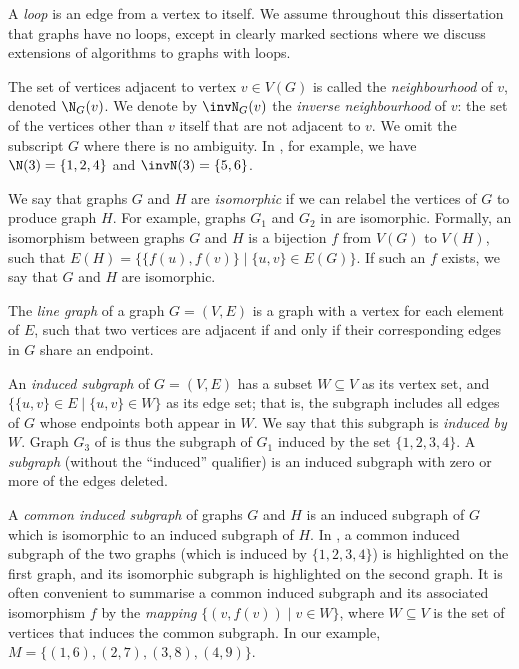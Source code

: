 A \emph{loop} is an edge from a vertex to itself. We assume throughout this
dissertation that graphs have no loops, except in clearly marked sections where
we discuss extensions of algorithms to graphs with loops.

The set of vertices adjacent to vertex $v \in V(G)$
is called the \emph{neighbourhood} of $v$, denoted $\N_G(v)$. We denote
by $\invN_G(v)$ the \emph{inverse neighbourhood} of $v$: the set
of the vertices other than $v$ itself that are not adjacent to $v$.
We omit the subscript $G$ where there is no ambiguity.
In , for example, we have $\N(3) = \{1,2,4\}$ and
$\invN(3) = \{5,6\}$.

We say that graphs $G$ and $H$ are \emph{isomorphic} if we can relabel
the vertices of $G$ to produce graph $H$. For example, graphs $G_1$
and $G_2$ in  are isomorphic.
Formally, an isomorphism between graphs $G$ and $H$ is a bijection $f$
from $V(G)$ to $V(H)$, such that $E(H) = \{\{f(u), f(v)\} \mid \{u, v\} \in E(G)\}$.
If such an $f$ exists, we say that $G$ and $H$ are isomorphic.

The \emph{line graph} of a graph $G=(V,E)$ is a graph with a vertex for each element
of $E$, such that two vertices are adjacent if and only if their corresponding edges
in $G$ share an endpoint.

An \emph{induced subgraph} of $G = (V, E)$ has a subset $W \subseteq V$ as its
vertex set, and $\{\{u, v\} \in E \mid \{u, v\} \in W\}$ as its edge set; that
is, the subgraph includes all edges of $G$ whose endpoints both appear in
$W$.  We say that this subgraph is \emph{induced by} $W$.
Graph $G_3$ of  is thus the subgraph
of $G_1$ induced by the set $\{1,2,3,4\}$.
A \emph{subgraph} (without the ``induced'' qualifier) is an induced subgraph
with zero or more of the edges deleted.

A \emph{common induced subgraph} of graphs $G$ and $H$ is an induced subgraph
of $G$ which is isomorphic to an induced subgraph of $H$. In
, a common induced subgraph of the two graphs (which is
induced by $\{1,2,3,4\}$) is highlighted on the first graph, and its isomorphic
subgraph is highlighted on the second graph.  It is often convenient to summarise
a common induced subgraph and its associated isomorphism $f$ by the \emph{mapping}
$\{(v,f(v)) \mid v \in W\}$, where $W \subseteq V$ is the set of vertices that
induces the common subgraph.  In our example, $M = \{(1,6), (2,7), (3,8), (4,9)\}$.

